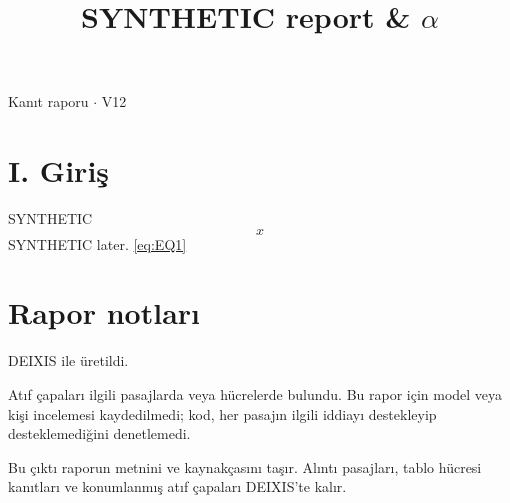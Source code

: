 \documentclass[journal]{IEEEtran}
\begin{document}
\renewcommand{\abstractname}{Özet}
\renewcommand{\IEEEkeywordsname}{Dizin Terimleri}
\renewcommand{\refname}{Kaynaklar}

\title{SYNTHETIC report \& \ensuremath{\alpha}}

\maketitle

\noindent Kanıt raporu \ensuremath{\cdot} V12

\section*{I. Giriş}

SYNTHETIC
\begin{equation}
\label{eq:EQ1}
x
\end{equation}
\cite{Synth26} SYNTHETIC later. \eqref{eq:EQ1} \cite{Synth26}

\section*{Rapor notları}

DEIXIS ile üretildi.

Atıf çapaları ilgili pasajlarda veya hücrelerde bulundu. Bu rapor için model veya kişi incelemesi kaydedilmedi; kod, her pasajın ilgili iddiayı destekleyip desteklemediğini denetlemedi.

Bu çıktı raporun metnini ve kaynakçasını taşır. Alıntı pasajları, tablo hücresi kanıtları ve konumlanmış atıf çapaları DEIXIS'te kalır.




\end{document}
